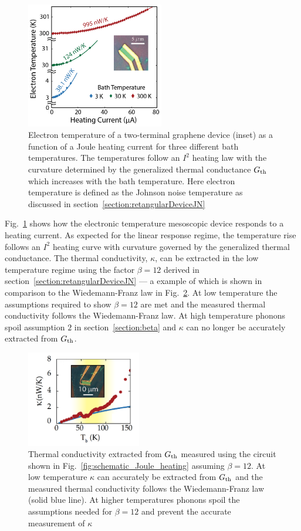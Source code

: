 \begin{figure}
\centering
\includegraphics[width=60mm]{figures/thermal_via_noise/quadratic_Joule_heating.png}
\caption{Electron temperature of a two-terminal graphene device (inset) as a function of a Joule heating current for three different bath temperatures. The temperatures follow an $I^2$ heating law with the curvature determined by the generalized thermal conductance $G_{\mathrm{th}}$ which increases with the bath temperature. Here electron temperature is defined as the Johnson noise temperature as discussed in section~\ref{section:retangularDeviceJN}}
\label{fig:quadratic_Joule_heating}
\end{figure}
Fig.~\ref{fig:quadratic_Joule_heating} shows how the electronic temperature mesoscopic device responds to a heating current. As expected for the linear response regime, the temperature rise follows an $I^2$ heating curve with curvature governed by the generalized thermal conductance. The thermal conductivity, $\kappa$, can be extracted in the low temperature regime using the factor $\beta = 12$ derived in section~\ref{section:retangularDeviceJN} --- a example of which is shown in comparison to the Wiedemann-Franz law in Fig.~\ref{fig:examplekappa}. At low temperature the assumptions required to show $\beta = 12$ are met and the measured thermal conductivity follows the Wiedemann-Franz law. At high temperature phonons spoil assumption $2$ in section~\ref{section:beta} and $\kappa$ can no longer be accurately extracted from $G_{\mathrm{th}}$.
\begin{figure}
\centering
\includegraphics[width=50mm]{figures/thermal_via_noise/kappa.png}
\caption{Thermal conductivity extracted from $G_{\mathrm{th}}$ measured using the circuit shown in Fig.~\ref{fig:schematic_Joule_heating} assuming $\beta = 12$. At low temperature $\kappa$ can accurately be extracted from $G_{\mathrm{th}}$ and the measured thermal conductivity follows the Wiedemann-Franz law (solid blue line). At higher temperatures phonons spoil the assumptions needed for $\beta = 12$ and prevent the accurate measurement of $\kappa$}
\label{fig:examplekappa}
\end{figure}